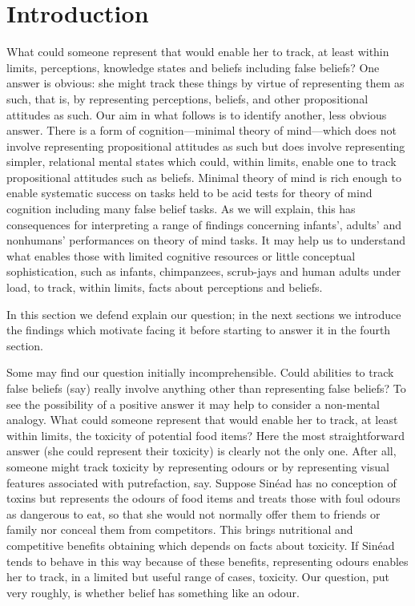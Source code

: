 \documentclass[12pt,\papersize]{extarticle}
\begin{document}
\section{Introduction}
What could someone represent that would enable her to track, at least within limits, perceptions, knowledge states and beliefs including false beliefs? 
One answer is obvious: she might track these things by virtue of representing them as such, that is, by representing perceptions, beliefs, and other propositional attitudes as such.
Our aim in what follows is to identify another, less obvious answer.
There is a form of cognition---minimal theory of mind---which does not involve representing propositional attitudes as such but does involve representing simpler, relational mental states which could, within limits, enable one to track propositional attitudes such as beliefs.
Minimal theory of mind 
is  rich enough to enable systematic success on tasks held to be acid tests for theory of mind cognition including many false belief tasks.
As we will explain, this has consequences 
for interpreting a range of findings concerning infants', adults' and nonhumans' performances on theory of mind tasks.
It may help us to understand what enables those with limited cognitive resources or little conceptual sophistication, such as infants, chimpanzees, scrub-jays and human adults under load, to track, within limits, facts about perceptions and beliefs.

In this section we defend explain our question; in the next sections we introduce the findings which motivate facing it before starting to answer it in the fourth section.

Some may find our question initially incomprehensible.
Could abilities to track false beliefs (say) really involve anything other than representing false beliefs?
To see the possibility of a positive answer it may help to consider a non-mental analogy.
What could someone represent that would enable her to track, at least within limits, the toxicity of potential food items?
Here the most straightforward answer (she could represent their toxicity) is clearly not the only one.
After all, someone might track toxicity by representing odours or by representing visual features associated with putrefaction, say.
Suppose Sin\'ead has no conception of toxins but represents the odours of food items and 
treats those with foul odours as dangerous to eat,
so that she would not normally offer them to friends or family
nor conceal them from competitors.
This brings nutritional and competitive benefits obtaining which depends on facts about toxicity.
If Sin\'ead tends to behave in this way because of these benefits, 
representing odours enables her to track, in a limited but useful range of cases,  toxicity.
Our question, put very roughly, is whether   belief has something like an odour.
\end{document}
